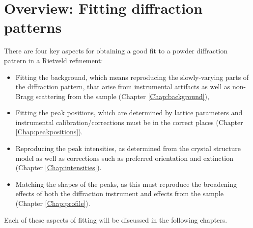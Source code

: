 

\chapter{Overview: Fitting diffraction patterns}

There are four key aspects for obtaining a good fit to a powder diffraction pattern in a Rietveld refinement: 
\begin{itemize}
     
\item Fitting the background, which means reproducing the slowly-varying parts of the diffraction pattern, that arise from instrumental artifacts as well as non-Bragg scattering from the sample (Chapter \ref{Chap:background}),

\item Fitting the peak positions, which are determined by lattice parameters and instrumental calibration/corrections must be in the correct places
(Chapter \ref{Chap:peakpositions}).


\item Reproducing the peak intensities, as determined from the crystal structure model as well as corrections such as preferred orientation and extinction 
(Chapter \ref{Chap:intensities}).


\item Matching the shapes of the peaks, as this must reproduce the broadening effects of both the diffraction instrument and effects from the sample (Chapter \ref{Chap:profile}). 

\end{itemize}

Each of these aspects of fitting will be discussed in the following chapters. 
